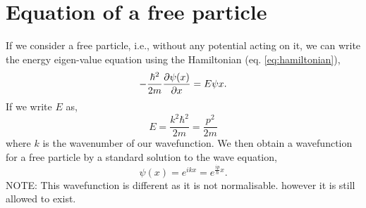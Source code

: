 \documentclass{book}
\begin{document}
\section{Equation of a free particle}
If we consider a free particle, i.e., without any potential acting on it, we can write the energy eigen-value equation using the Hamiltonian (eq. \eqref{eq:hamiltonian}),
\begin{equation}
	-\frac{\hbar^2}{2m}\pdv{\psi(x)}{x} = E\psi{x}.
\end{equation}
If we write $E$ as,
\begin{equation}
	E = \frac{k^2 \hbar^2}{2m} = \frac{p^2}{2m}
\end{equation}
where $k$ is the wavenumber of our wavefunction. We then obtain a wavefunction for a free particle by a standard solution to the wave equation,
\begin{equation}
	\psi(x) = e^{ikx} = e^{\frac{ip}{\hbar}x}.
\end{equation}
NOTE: This wavefunction is different as it is not normalisable. however it is still allowed to exist.
\end{document}
